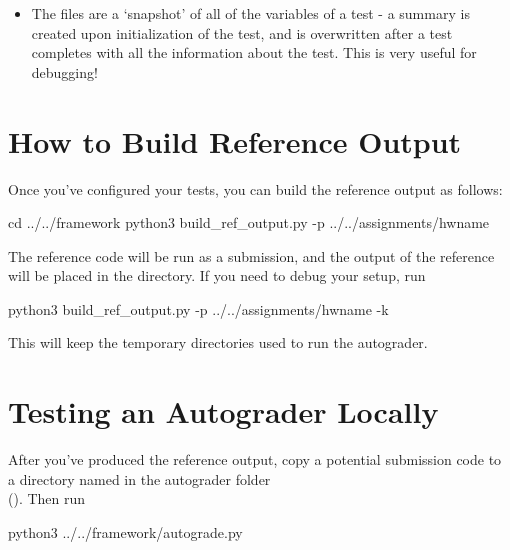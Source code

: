 \documentclass[11pt]{report}
\begin{document}
\begin{itemize}
      \item The  files are a 
      `snapshot' of all of the variables of a test - a summary is created upon initialization of the test, 
      and is overwritten after a test completes with all the information about the test. This is very useful
      for debugging!
\end{itemize}


\section*{How to Build Reference Output}
Once you've configured your tests, you can build the reference output as follows:
\begin{bashcodeblock}
cd ../../framework
python3 build_ref_output.py -p ../../assignments/hwname
\end{bashcodeblock}
The reference code will be run as a submission, and the output of the reference will be placed in 
the  directory. If you need to debug your setup, run 
\begin{bashcodeblock}
python3 build_ref_output.py -p ../../assignments/hwname -k
\end{bashcodeblock}
This will keep the temporary directories used to run the autograder. 

\section*{Testing an Autograder Locally}
After you've produced the reference output, copy a potential submission code to a directory named 
 in the autograder folder \\(). Then run 
\begin{bashcodeblock}
python3 ../../framework/autograde.py
\end{bashcodeblock}
\end{document}
